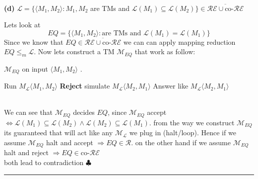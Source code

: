 \documentclass[12pt]{article}
\begin{document}
\begin{center}
\hrulefill\\ 
\end{center}
\begin{center}
\textbf{(d)} $\mathcal{L} = \{\langle M_1,M_2\rangle : M_1,M_2 $ are TMs and $\mathcal{L}(M_1)\subseteq \mathcal{L}(M_2)\} \in \overline{\mathcal{RE}\cup\text{co-} \mathcal{RE}}$
\end{center}
 Lets look at \[ EQ=\{ \langle M_1,M_2\rangle :\text{are TMs and } \mathcal{L}(M_1)=\mathcal{L}(M_1)\} \]
Since we know that $EQ\in \overline{\mathcal{RE}\cup\text{co-}\mathcal{RE}}$ we can can apply mapping reduction $EQ\leq_m \mathcal{L}$. Now lets construct a TM $\mathcal{M}_{EQ}$ that work as follow:
\begin{algorithm}
\caption{ $\mathcal{M}_{EQ}$ on input $\langle M_1,M_2\rangle$ .}\label{alg:cap}
\begin{algorithmic} 
\State Run $M_\mathcal{L}\langle M_1,M_2\rangle$
   \textbf{Reject} 
\EndIf
{} simulate $M_\mathcal{L}\langle M_2,M_1\rangle$  
\State Answer like $M_\mathcal{L}\langle M_2,M_1\rangle$ 
\EndIf
\end{algorithmic}
\end{algorithm}\\
We can see that $\mathcal{M}_{EQ}$ decides $EQ$, since $\mathcal{M}_{EQ}$ accept $\Leftrightarrow \mathcal{L}(M_1)\subseteq \mathcal{L}(M_2)\wedge\mathcal{L}(M_2)\subseteq \mathcal{L}(M_1)$.
from the way we construct  $\mathcal{M}_{EQ}$ its guaranteed that will act like any $\mathcal{M_L}$ we plug in (halt/loop). Hence if we assume $\mathcal{M}_{EQ}$ halt and accept  $\Rightarrow EQ\in \mathcal{R}$. on the other hand if we assume $\mathcal{M}_{EQ}$ halt and reject  $\Rightarrow EQ\in \text{co-}\mathcal{RE}$
\\both lead to contradiction $\clubsuit$
\hrule
\end{document}
